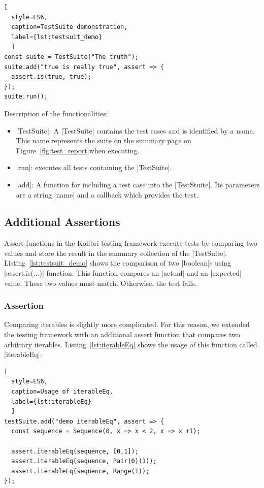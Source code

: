 \begin{lstlisting}[
  style=ES6, 
  caption=TestSuite demonstration,
  label={lst:testsuit_demo}
  ]
const suite = TestSuite("The truth");
suite.add("true is really true", assert => {
  assert.is(true, true);
});
suite.run();
\end{lstlisting}

Description of the functionalities: 

\begin{itemize}
  \item{|TestSuite|: A |TestSuite| contains the test cases and is identified by a
    name. This name represents the suite on the summary page on
  Figure~\ref{fig:test_report}when executing.}
  \item{|run|: executes all tests containing the |TestSuite|.}
  \item{|add|: A function for including a test case into the |TestStuite|. Its
      parameters are a string |name| and a callback which provides the test.}
\end{itemize}

\subsection{Additional Assertions}
\label{sub:Additional Assertions}

Assert functions in the Kolibri testing framework execute tests by comparing
two values and store the result in the summary collection of the |TestSuite|.
Listing~\ref{lst:testsuit_demo} shows the comparison of two |boolean|s using
|assert.is(...)| function.
This function compares an |actual| and an |expected| value. These two values
must match. Otherwise, the test fails.

\subsubsection{Assertion}
\label{subsub:Assertion for Iterables}
Comparing iterables is slightly more complicated. For this reason, we extended
the testing framework with an additional assert function that compares two
arbitrary iterables. Listing~\ref{lst:iterableEq} shows the usage of this
function called |iterableEq|:

\begin{lstlisting}[
  style=ES6, 
  caption=Usage of iterableEq,
  label={lst:iterableEq}
  ]
testSuite.add("demo iterableEq", assert => {
  const sequence = Sequence(0, x => x < 2, x => x +1);

  assert.iterableEq(sequence, [0,1]);
  assert.iterableEq(sequence, Pair(0)(1));
  assert.iterableEq(sequence, Range(1));
});  
\end{lstlisting}


